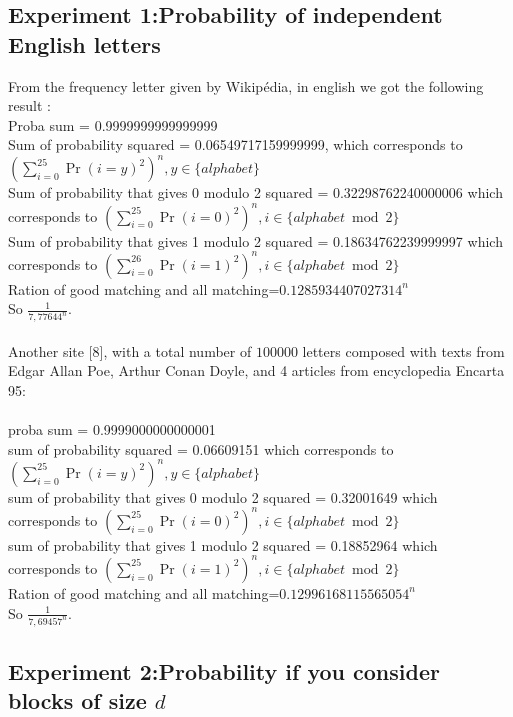 \documentclass{article}
\begin{document}
\subsection{Experiment 1:Probability of independent English letters}
From the frequency letter given by Wikip\'edia, in english we got the following result :\\
Proba sum = 0.9999999999999999\\
Sum of probability squared = 0.06549717159999999, which corresponds to $(\sum_{i=0}^{25}{\Pr(i=y)^2})^n, y \in \{alphabet\} $\\
Sum of probability that gives 0 modulo 2 squared  = 0.32298762240000006 which corresponds to $(\sum_{i=0}^{25}{\Pr(i=0)^2})^n, i \in \{alphabet \bmod 2\} $\\
Sum of probability that gives 1 modulo 2 squared = 0.18634762239999997 which corresponds to $(\sum_{i=0}^{26}{\Pr(i=1)^2})^n, i \in \{alphabet \bmod 2\} $\\
Ration of good matching and all matching=$0.1285934407027314^n$\\
So $\frac{1}{7,77644^n}$.
\\
\\
Another site [8], with a total number of $100000$ letters composed with texts from Edgar Allan Poe, Arthur Conan Doyle, and 4 articles from encyclopedia Encarta 95:\\
\\
proba sum = 0.9999000000000001\\
sum of probability squared = 0.06609151 which corresponds to $(\sum_{i=0}^{25}{\Pr(i=y)^2})^n, y \in \{alphabet\} $\\
sum of probability that gives 0 modulo 2 squared = 0.32001649 which corresponds to $(\sum_{i=0}^{25}{\Pr(i=0)^2})^n, i \in \{alphabet \bmod 2\} $\\
sum of probability that gives 1 modulo 2 squared = 0.18852964 which corresponds to $(\sum_{i=0}^{25}{\Pr(i=1)^2})^n, i \in \{alphabet \bmod 2\} $\\
Ration of good matching and all matching=$0.12996168115565054^n$\\
So $\frac{1}{7,69457^n}$.

\subsection{Experiment 2:Probability if you consider blocks of size $d$}
\end{document}
